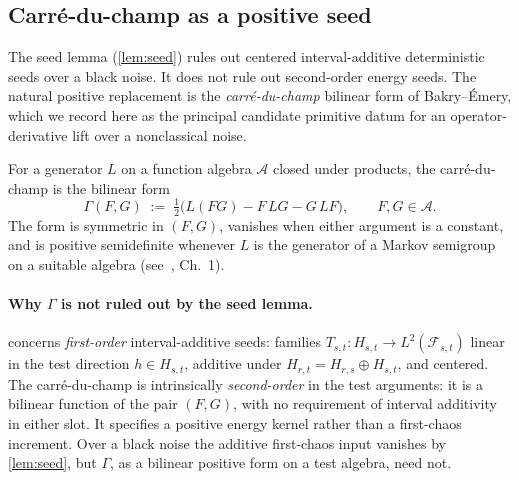\documentclass[11pt,reqno]{amsart}
\theoremstyle{plain}
\theoremstyle{definition}
\theoremstyle{remark}
\begin{document}
\subsection{\texorpdfstring{Carr\'e-du-champ as a positive seed}{Carre-du-champ as a positive seed}}\label{sec:cdc-seed}

The seed lemma (\cref{lem:seed}) rules out centered interval-additive
deterministic seeds over a black noise. It does not rule out
second-order energy seeds. The natural positive replacement is the
\emph{carr\'e-du-champ} bilinear form of Bakry--\'Emery, which we
record here as the principal candidate primitive datum for an
operator-derivative lift over a nonclassical noise.

For a generator $L$ on a function algebra $\mathcal A$ closed under
products, the carr\'e-du-champ is the bilinear form
\begin{equation}\label{eq:carre-du-champ}
  \Gamma(F,G)\;:=\;\tfrac{1}{2}\bigl(L(FG)-F\,LG-G\,LF\bigr),
  \qquad F,G\in\mathcal A.
\end{equation}
The form is symmetric in $(F,G)$, vanishes when either argument is a
constant, and is positive semidefinite whenever $L$ is the generator
of a Markov semigroup on a suitable algebra
(see~\cite{BakryGentilLedoux}, Ch.~1).

\paragraph{Why $\Gamma$ is not ruled out by the seed lemma.}
 concerns \emph{first-order} interval-additive seeds:
families $T_{s,t}\colon H_{s,t}\to L^{2}(\mathcal F_{s,t})$ linear in
the test direction $h\in H_{s,t}$, additive under
$H_{r,t}=H_{r,s}\oplus H_{s,t}$, and centered. The carr\'e-du-champ
is intrinsically \emph{second-order} in the test arguments: it is a
bilinear function of the pair $(F,G)$, with no requirement of
interval additivity in either slot. It specifies a positive energy
kernel rather than a first-chaos increment. Over a black noise the
additive first-chaos input vanishes by \cref{lem:seed}, but
$\Gamma$, as a bilinear positive form on a test algebra, need not.
\end{document}
